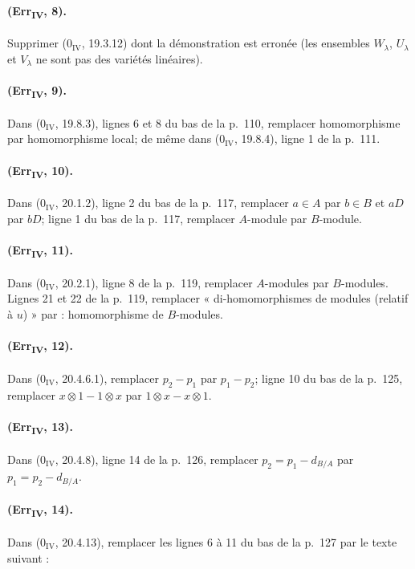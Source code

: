 \paragraph{(Err\textsubscript{IV}, 8).}
Supprimer ($0_{\mathrm{IV}}$, 19.3.12) dont la démonstration est erronée
(les ensembles $W_\lambda$, $U_\lambda$ et $V_\lambda$ ne sont pas des
variétés linéaires).

\paragraph{(Err\textsubscript{IV}, 9).}
Dans ($0_{\mathrm{IV}}$, 19.8.3), lignes 6 et 8 du bas de la p.~110,
remplacer homomorphisme par homomorphisme local; de même dans
($0_{\mathrm{IV}}$, 19.8.4), ligne 1 de la p.~111.

\paragraph{(Err\textsubscript{IV}, 10).}
Dans ($0_{\mathrm{IV}}$, 20.1.2), ligne 2 du bas de la p.~117,
remplacer $a\in A$ par $b\in B$ et $aD$ par $bD$; ligne 1 du bas de la
p.~117, remplacer $A$-module par $B$-module.

\paragraph{(Err\textsubscript{IV}, 11).}
Dans ($0_{\mathrm{IV}}$, 20.2.1), ligne 8 de la p.~119, remplacer
$A$-modules par $B$-modules. Lignes 21 et 22 de la p.~119, remplacer
« di-homomorphismes de modules (relatif à $u$) » par : homomorphisme
de $B$-modules.

\paragraph{(Err\textsubscript{IV}, 12).}
Dans ($0_{\mathrm{IV}}$, 20.4.6.1), remplacer $p_2-p_1$ par $p_1-p_2$;
ligne 10 du bas de la p.~125, remplacer $x\otimes1-1\otimes x$ par
$1\otimes x-x\otimes1$.

\paragraph{(Err\textsubscript{IV}, 13).}
Dans ($0_{\mathrm{IV}}$, 20.4.8), ligne 14 de la p.~126, remplacer
$p_2=p_1-d_{B/A}$ par $p_1=p_2-d_{B/A}$.

\paragraph{(Err\textsubscript{IV}, 14).}
Dans ($0_{\mathrm{IV}}$, 20.4.13), remplacer les lignes 6 à 11 du bas
de la p.~127 par le texte suivant :

